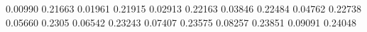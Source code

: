 0.00990  0.21663
0.01961  0.21915
0.02913  0.22163
0.03846  0.22484
0.04762  0.22738
0.05660  0.2305
0.06542  0.23243
0.07407  0.23575
0.08257  0.23851
0.09091  0.24048

